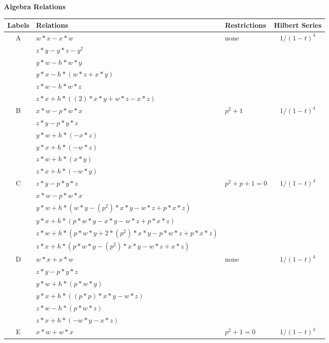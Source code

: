 \documentclass[12]{article}
\begin{document}
\begin{center}
\textbf{\Large{Algebra Relations}}
\end{center}
\begin{longtable}[c]{|c|p{5.75cm}|p{2.75cm}|c|}
\toprule
 Labels & Relations & Restrictions & Hilbert Series \\ 
\endfirsthead 
  \hline
   A & $ w*x - x*w $ &\multirow{6}{*}{none} &\multirow{6}{*}{$ 1/(1-t)^4 $} \\ 
    & $ z*y - y*z - y^2 $ & &  \\ 
   & $ y*w - h*w*y	$ & & \\  
   & $ y*x - h*(w*z + x*y) $ & & \\  
   & $ z*w - h*w*z $ & & \\ 
   & $ z*x + h*((2)*x*y + w*z - x*z) $ & &  \\  
\hline
 B & $ x*w - p*w*x $ &\multirow{6}{*}{$ p^2+1 $} &\multirow{6}{*}{$ 1/(1-t)^4 $} \\ 
    & $ z*y - p*y*z $ & &  \\ 
   & $ y*w + h*(-x*z) $ & & \\  
   & $ y*x + h*(-w*z) $ & & \\  
   & $  z*w + h*(x*y) $ & & \\ 
   & $ z*x + h*(-w*y) $ & &  \\  
\hline
 C & $  z*y - p*y*z $ &\multirow{6}{*}{$ p^2 + p + 1 = 0 $} &\multirow{6}{*}{$ 1/(1-t)^4 $} \\ 
    & $  x*w - p*w*x $ & &  \\ 
   & $ y*w + h*(w*y - (p^2)*x*y - w*z + p*x*z) $ & & \\  
   & $ y*x + h*(p*w*y - x*y - w*z + p*x*z) $ & & \\  
   & $  z*w + h*(p*w*y + 2*(p^2)*x*y - p*w*z + p*x*z) $ & & \\ 
   & $  z*x + h*(p*w*y - (p^2)*x*y - w*z + x*z) $ & &  \\  
\hline
 D & $ w*x + x*w $ &\multirow{6}{*}{none} &\multirow{6}{*}{$ 1/(1-t)^4 $} \\ 
    & $ z*y - p*y*z $ & &  \\ 
   & $ y*w + h*(p*w*y) $ & & \\  
   & $ y*x + h*((p*p)*x*y - w*z) $ & & \\  
   & $ z*w - h*(p*w*z) $ & & \\ 
   & $ z*x + h*(-w*y - x*z) $ & &  \\  
\hline
 E & $ x*w + w*x $ &\multirow{6}{*}{$ p^2+1=0 $} &\multirow{6}{*}{$ 1/(1-t)^4 $} \\ 

\end{longtable}
\end{document}
